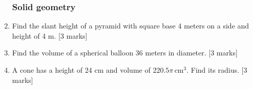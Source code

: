 \documentclass[12pt, twoside]{article}
\begin{document}
\begin{enumerate}
\newpage
\subsubsection*{Solid geometry}
\item Find the slant height of a pyramid with square base 4 meters on a side and height of 4 m. \hfill [3 marks]


  \item Find the volume of a spherical balloon 36 meters in diameter. \hfill [3 marks]
  
  \item A cone has a height of 24 cm and volume of $220.5\pi \,\mathrm{ cm}^3$. Find its radius. \hfill [3 marks]
  


\end{enumerate}
\end{document}
